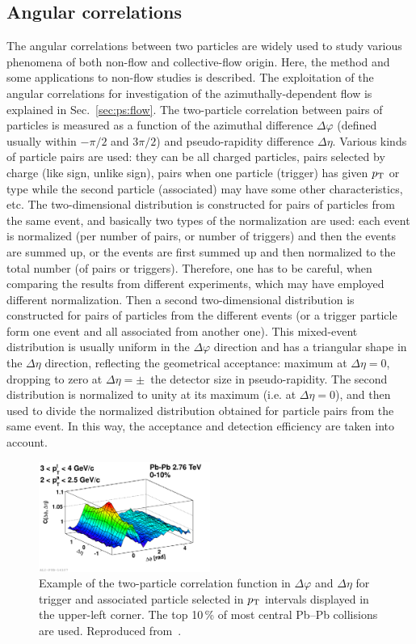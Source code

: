 \subsection{Angular correlations}
\label{subsecks:angular}
The angular correlations between two particles are widely used to study various phenomena of both non-flow and collective-flow origin. Here, the method and some applications to non-flow studies is described. The exploitation of the angular correlations for investigation of the azimuthally-dependent flow is explained in Sec.~\ref{sec:ps:flow}. The two-particle correlation between pairs of particles is measured as a function of the azimuthal difference $\Delta\varphi$ (defined usually within $−\pi/2$ and $3\pi/2$) and pseudo-rapidity difference $\Delta\eta$. Various kinds of particle pairs are used: they can be all charged particles, pairs selected by charge (like sign, unlike sign), pairs when one particle (trigger) has given $p_{\rm T}$ or type while the second particle (associated) may have some other characteristics, etc. The two-dimensional distribution is constructed for pairs of particles from the same event, and basically two types of the normalization are used: each event is normalized (per number of pairs, or number of triggers) and then the events are summed up, or the events are first summed up and then normalized to the total number (of pairs or triggers). Therefore, one has to be careful, when comparing the results from different experiments, which may have employed different normalization. Then a second two-dimensional distribution is constructed for pairs of particles from the different events (or a trigger particle form one event and all associated from another one). This mixed-event distribution is usually uniform in the $\Delta\varphi$ direction and has a triangular shape in the $\Delta\eta$ direction, reflecting the geometrical acceptance: maximum at $\Delta\eta = 0$, dropping to zero at $\Delta\eta = \pm$~the detector size in pseudo-rapidity. The second distribution is normalized to unity at its maximum (i.e. at $\Delta\eta = 0$), and then used to divide the normalized distribution obtained for particle pairs from the same event. In this way, the acceptance and detection efficiency are taken into account.

\begin{figure}
\centering
\includegraphics[width=0.5\textwidth]{ksfigures/TwoParticleCorrFunction.pdf}
\caption{Example of the two-particle correlation function in $\Delta\varphi$ and $\Delta\eta$ for trigger and associated particle selected in $p_{\rm T}$ intervals displayed in the upper-left corner. The top 10\,\% of most central Pb--Pb collisions are used. Reproduced from~\cite{}.}
\label{figks:CorrExamle}
\end{figure}


